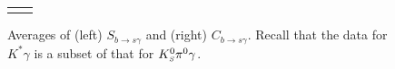 \begin{figure}[htbp]
\begin{center}
\begin{tabular}{cc}
{      }
    \end{tabular}
  \end{center}
  \vspace{-0.8cm}
  \caption{
    Averages of (left) $S_{b \to s \gamma}$ and (right) $C_{b \to s \gamma}$.
    Recall that the data for $K^*\gamma$ is a subset of that for $K^0_{\scriptscriptstyle S}\pi^0\gamma$.
  }
  \label{fig:cp_uta:bsg}
\end{figure}

\begin{figure}[htbp]
  \begin{center}
    \hspace{0.08\textwidth}
    \resizebox{0.33\textwidth}{!}{
}
\end{center}
\end{figure}
